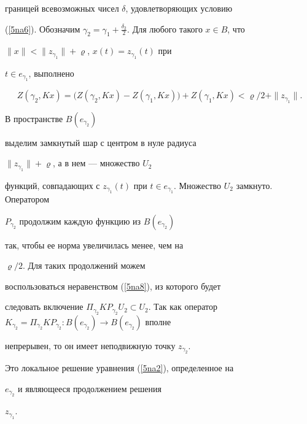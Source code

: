 \begin{pf}
границей всевозможных чисел $\delta$, удовлетворяющих условию


(\ref{5na6}). Обозначим $\gamma_2= \gamma_1+


\frac{\delta_2}{2}$. Для любого такого $x\in B$, что


$\|x\|<\|z_{\gamma_{1}}\|+\varrho$, $x(t)=z_{\gamma_{1}} (t)$ при


$t \in e_{\gamma_{1}}$, выполнено


\begin{equation}


\label{5na8}


Z(\gamma_{2},K x)=\big(Z(\gamma_{2},K x)-Z(\gamma_{1},


K x)\big)+Z(\gamma_{1}, K x)<


{\varrho}/{2}+\|z_{\gamma_{1}}\|.


\end{equation}


В пространстве $B(e_{\gamma_{2}})$


выделим замкнутый шар с центром в нуле радиуса


$\|z_{\gamma_{1}}\|+\varrho$, а в нем --- множество $U_2$


функций, совпадающих с $z_{\gamma_{1}} (t)$ при $t \in


e_{\gamma_{1}}$. Множество $U_2$ замкнуто. Оператором


$P_{\gamma_2}$ продолжим каждую функцию из $B(e_{\gamma_{2}})$


так, чтобы ее норма увеличилась менее, чем на


${\varrho}/{2}$. Для таких продолжений можем


воспользоваться неравенством (\ref{5na8}), из которого будет


следовать включение $\Pi_{\gamma_{2}}K P_{\gamma_{2}} U_2


\subset U_2$. Так как оператор $K_{\gamma_{2}} =


\Pi_{\gamma_{2}} K P_{\gamma_{2}}


:B(e_{\gamma_{2}})\to B(e_{\gamma_{2}})$ вполне


непрерывен, то он имеет неподвижную точку $z_{\gamma_{2}}$.


Это локальное решение уравнения (\ref{5na2}), определенное на


$e_{\gamma_{2}}$ и являющееся продолжением решения


$z_{\gamma_{1}}$.






\end{pf}
